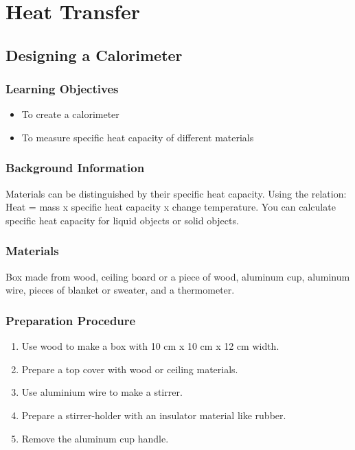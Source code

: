 \section{Heat Transfer}

\subsection{Designing a Calorimeter}

\subsubsection*{Learning Objectives}
\begin{itemize}
\item{To create a calorimeter}
\item{To measure specific heat capacity of different materials}
\end{itemize}

\subsubsection*{Background Information}
Materials can be distinguished by their specific heat capacity. Using the relation: Heat = mass x specific heat capacity x change temperature. You can calculate specific heat capacity for liquid objects or solid objects.

\subsubsection*{Materials}
Box made from wood, ceiling board or a piece of wood, aluminum cup, aluminum wire, pieces of blanket or sweater, and a thermometer.

\subsubsection*{Preparation Procedure}
\begin{enumerate}
\item{Use wood to make a box with 10 cm x 10 cm x 12 cm width.}
\item{Prepare a top cover with wood or ceiling materials.}
\item{Use aluminium wire to make a stirrer.}
\item{Prepare a stirrer-holder with an insulator material like rubber.}
\item{Remove the aluminum cup handle.}
\end{enumerate}

